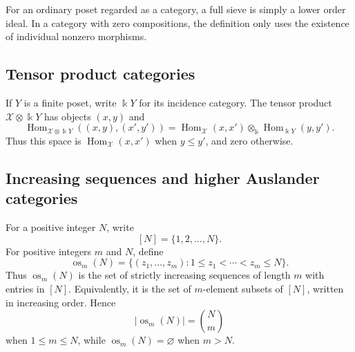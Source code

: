 \documentclass[12pt,a4paper,english,reqno]{amsart}
\theoremstyle{plain}
\theoremstyle{definition}
\newcommand{\kk}{\Bbbk}
\newcommand{\Hom}{\operatorname{Hom}}
\newcommand{\X}{\mathcal X}
\newcommand{\os}{\operatorname{os}}
\begin{document}
For an ordinary poset regarded as a category, a full sieve is simply a lower
order ideal.  In a category with zero compositions, the definition only uses
the existence of individual nonzero morphisms.

\subsection{Tensor product categories}

If $Y$ is a finite poset, write $\kk Y$ for its incidence category.
The tensor product $\X\otimes\kk Y$ has objects $(x,y)$ and
\[
 \Hom_{\X\otimes\kk Y}((x,y),(x',y'))
 =
 \Hom_{\X}(x,x')\otimes_{\kk}\Hom_{\kk Y}(y,y').
\]
Thus this space is $\Hom_{\X}(x,x')$ when $y\leq y'$, and zero otherwise.

\subsection{Increasing sequences and higher Auslander categories}

For a positive integer $N$, write
\[
[N]=\{1,2,\ldots,N\}.
\]
For positive integers $m$ and $N$, define
\[
\os_m(N)
=
\{(z_1,\ldots,z_m):
1\leq z_1<\cdots<z_m\leq N\}.
\]
Thus $\os_m(N)$ is the set of strictly increasing sequences of length
$m$ with entries in $[N]$. Equivalently, it is the set of $m$-element
subsets of $[N]$, written in increasing order. Hence
\[
|\os_m(N)|=\binom{N}{m}
\]
when $1\leq m\leq N$, while $\os_m(N)=\varnothing$ when $m>N$.
\end{document}
